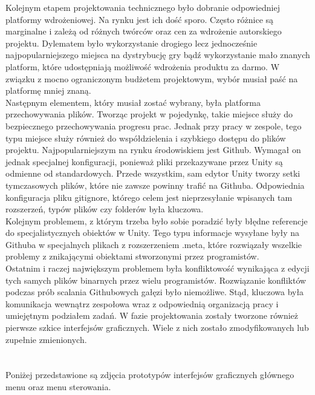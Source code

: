 \documentclass[oneside,polski,logo]{amuthesis}
\begin{document}
Kolejnym etapem projektowania technicznego było dobranie odpowiedniej platformy wdrożeniowej. Na rynku jest ich dość sporo. Często różnice są marginalne i zależą od różnych twórców oraz cen za wdrożenie autorskiego projektu. Dylematem było wykorzystanie drogiego lecz jednocześnie najpopularniejszego miejsca na dystrybucję gry bądź wykorzystanie mało znanych platform, które udostępniają możliwość wdrożenia produktu za darmo. W związku z mocno ograniczonym budżetem projektowym, wybór musiał paść na platformę mniej znaną.\\

Następnym elementem, który musiał zostać wybrany, była platforma przechowywania plików. Tworząc projekt w pojedynkę, takie miejsce służy do bezpiecznego przechowywania progresu prac. Jednak przy pracy w zespole, tego typu miejsce służy również do współdzielenia i szybkiego dostępu do plików projektu. Najpopularniejszym na rynku środowiskiem jest Github. Wymagał on jednak specjalnej konfiguracji, ponieważ pliki przekazywane przez Unity są odmienne od standardowych. Przede wszystkim, sam edytor Unity tworzy setki tymczasowych plików, które nie zawsze powinny trafić na Githuba. Odpowiednia konfiguracja pliku gitignore, którego celem jest nieprzesyłanie wpisanych tam rozszerzeń, typów plików czy folderów była kluczowa.\\

Kolejnym problemem, z którym trzeba było sobie poradzić były błędne referencje do specjalistycznych obiektów w Unity. Tego typu informacje wysyłane były na Githuba w specjalnych plikach z rozszerzeniem .meta, które rozwiązały wszelkie problemy z znikającymi obiektami stworzonymi przez programistów.\\

Ostatnim i raczej największym problemem była konfliktowość wynikająca z edycji tych samych plików binarnych przez wielu programistów. Rozwiązanie konfliktów podczas prób scalania Githubowych gałęzi było niemożliwe. Stąd, kluczowa była komunikacja wewnątrz zespołowa wraz z odpowiednią organizacją pracy i umiejętnym podziałem zadań. W fazie projektowania zostały tworzone również pierwsze szkice interfejsów graficznych. Wiele z nich zostało zmodyfikowanych lub zupełnie zmienionych.\\ \\ \\
Poniżej przedstawione są zdjęcia prototypów interfejsów graficznych głównego menu oraz menu sterowania.\\ \\ 
\end{document}
